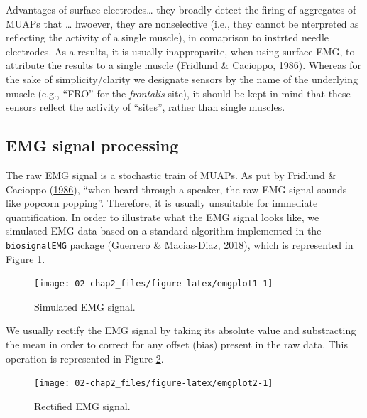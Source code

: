 \documentclass[a4paper,12pt,twoside,openright,oldfontcommands]{memoir}
\begin{document}
Advantages of surface electrodes\ldots{} they broadly detect the firing
of aggregates of MUAPs that \ldots{} hwoever, they are nonselective
(i.e., they cannot be nterpreted as reflecting the activity of a single
muscle), in comaprison to instrted needle electrodes. As a results, it
is usually inapproparite, when using surface EMG, to attribute the
results to a single muscle (Fridlund \& Cacioppo,
\protect\hyperlink{ref-fridlund_guidelines_1986}{1986}). Whereas for the
sake of simplicity/clarity we designate sensors by the name of the
underlying muscle (e.g., ``FRO'' for the \emph{frontalis} site), it
should be kept in mind that these sensors reflect the activity of
``sites'', rather than single muscles.

\subsection{EMG signal processing}\label{emg-signal-processing}

The raw EMG signal is a stochastic train of MUAPs. As put by Fridlund \&
Cacioppo (\protect\hyperlink{ref-fridlund_guidelines_1986}{1986}),
``when heard through a speaker, the raw EMG signal sounds like popcorn
popping''. Therefore, it is usually unsuitable for immediate
quantification. In order to illustrate what the EMG signal looks like,
we simulated EMG data based on a standard algorithm implemented in the
\texttt{biosignalEMG} package (Guerrero \& Macias-Diaz,
\protect\hyperlink{ref-R-biosignalEMG}{2018}), which is represented in
Figure \ref{fig:emgplot1}.

\begin{figure}[H]

{\centering \texttt{[image: 02-chap2\_files/figure-latex/emgplot1-1]} 

}

\caption{Simulated EMG signal.}\label{fig:emgplot1}
\end{figure}

We usually rectify the EMG signal by taking its absolute value and
substracting the mean in order to correct for any offset (bias) present
in the raw data. This operation is represented in Figure
\ref{fig:emgplot2}.

\begin{figure}[H]

{\centering \texttt{[image: 02-chap2\_files/figure-latex/emgplot2-1]} 

}

\caption{Rectified EMG signal.}\label{fig:emgplot2}
\end{figure}
\end{document}
